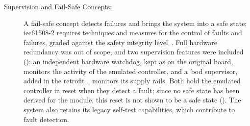 \begin{description}
	\item[Supervision and Fail-Safe Concepts:] A fail-safe concept detects failures and brings the system into a safe state; \mbox{\gls{iec61508}-2} requires techniques and measures for the control of faults and failures, graded against the safety integrity level~\cite{iec61508_2_2010}. Full hardware redundancy was out of scope, and two supervision features were included (): an independent hardware watchdog, kept as on the original board, monitors the activity of the emulated controller, and a~\gls{bod} supervisor, added in the retrofit~\cite[Sec.~2]{leyer2023}, monitors its supply rails. Both hold the emulated controller in reset when they detect a fault; since no safe state has been derived for the module, this reset is not shown to be a safe state (). The system also retains its legacy self-test capabilities, which contribute to fault detection.
\end{description}
